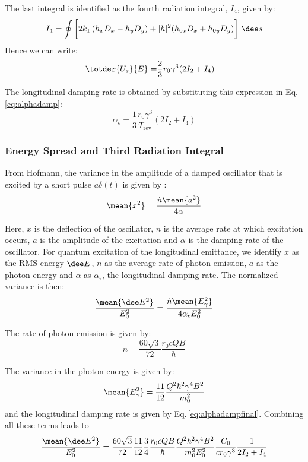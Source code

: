 The last integral is identified as the fourth radiation integral, $I_4$, given by:
\begin{equation}
    I_4 = \oint \bigg[2k_1 \left( h_x D_x - h_y D_y \right) + |h|^2 (h_{0x}D_x + h_{0y} D_y)\bigg] \ \dee s
\end{equation}
Hence we can write:
\begin{align}
    \totder{U_s}{E} = &\frac{2}{3} r_0 \gamma^3 (2I_2 + I_4 )
\end{align}

The longitudinal damping rate is obtained by substituting this expression in Eq.\,\eqref{eq:alphadamp}:
\begin{equation}
    \alpha_\epsilon =
      \frac{1}{3} \frac{r_0 \gamma^3}{T_\text{rev}} (2I_2 + I_4 )
    \label{eq:alphadampfinal}
\end{equation}


\subsubsection{Energy Spread and Third Radiation Integral}
\label{sec:enespreadandi3}

From Hofmann, the variance in the amplitude of a damped oscillator that is excited by a short pulse $a\delta(t)$ is given by \cite{hofmann_2004}:
\begin{equation}
    \mean{x^2} = \frac{\dot{n} \mean{a^2}}{4\alpha}
\end{equation}

Here, $x$ is the deflection of the oscillator, $\dot{n}$ is the average rate at which excitation occurs, $a$ is the amplitude of the excitation and $\alpha$ is the damping rate of the oscillator. For quantum excitation of the longitudinal emittance, we identify $x$ as the RMS energy $\dee E$, $\dot{n}$ as the average rate of photon emission, $a$ as the photon energy and $\alpha$ as $\alpha_\epsilon$, the longitudinal damping rate. The normalized variance is then:
\begin{equation}
    \frac{\mean{\dee E^2}}{E_0^2} = \frac{\dot{n} \mean{E_\gamma^2}}{4 \alpha_\epsilon E_0^2}
    \label{eq:notreallycampbell}
\end{equation}

The rate of photon emission is given by:
\begin{equation}
    \dot{n} = \frac{60 \sqrt{3}}{72} \frac{r_0 c Q B}{\hbar}
\end{equation}

The variance in the photon energy is given by:
\begin{equation}
    \mean{E_\gamma^2} = \frac{11}{12} \frac{Q^2\hbar^2 \gamma^4 B^2}{m_0^2}
\end{equation}
and the longitudinal damping rate is given by Eq.\,\eqref{eq:alphadampfinal}.
Combining all these terms leads to
\begin{equation}
    \frac{\mean{\dee E^2}}{E_0^2} = \frac{60 \sqrt{3}}{72} \frac{11}{12} \frac{3}{4} \frac{r_0 c Q B}{\hbar} \frac{Q^2\hbar^2 \gamma^4 B^2}{m_0^2 E_0^2} \frac{C_0}{c r_0 \gamma^3} \frac{1}{2I_2 + I_4}
\end{equation}

